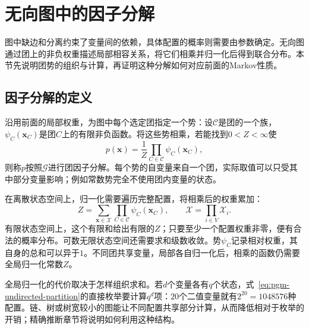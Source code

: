 \section{无向图中的因子分解}
\label{sec:pgm-undirected-factorization}

图中缺边和分离约束了变量间的依赖，具体配置的概率则需要由参数确定。无向图通过团上的非负权重描述局部相容关系，将它们相乘并归一化后得到联合分布。本节先说明团势的组织与计算，再证明这种分解如何对应前面的Markov性质。

\subsection{因子分解的定义}
\label{sec:pgm-undirected-factorization-definition}

沿用前面的局部权重，为图中每个选定团指定一个势：设$\mathcal{C}$是团的一个族，$\psi_C(\bm{x}_C)$是团$C$上的有限非负函数。将这些势相乘，若能找到$0<Z<\infty$使
\begin{equation}
  p(\bm{x})=\frac{1}{Z}\prod_{C\in\mathcal{C}}\psi_C(\bm{x}_C),
  \label{eq:pgm-undirected-factorization}
\end{equation}
则称$p$按照$\mathcal{G}$进行团因子分解。每个势的自变量来自一个团，实际取值可以只受其中部分变量影响；例如常数势完全不使用团内变量的状态。

在离散状态空间上，归一化需要遍历完整配置，将相乘后的权重累加：
\begin{equation}
  Z=\sum_{\bm{x}\in\mathcal{X}}\prod_{C\in\mathcal{C}}\psi_C(\bm{x}_C),
  \qquad
  \mathcal{X}=\prod_{i\in V}\mathcal{X}_i.
  \label{eq:pgm-undirected-partition}
\end{equation}
有限状态空间上，这个有限和给出有限的$Z$；只要至少一个配置权重非零，便有合法的概率分布。可数无限状态空间还需要求和级数收敛。势$\psi_C$记录相对权重，其自身的总和可以异于$1$。不同团共享变量，局部各自归一化后，相乘的函数仍需要全局归一化常数$Z$。

全局归一化的代价取决于怎样组织求和。若$d$个变量各有$q$个状态，式~\eqref{eq:pgm-undirected-partition}的直接枚举要计算$q^d$项：$20$个二值变量就有$2^{20}=1048576$种配置。链、树或树宽较小的图能让不同配置共享部分计算，从而降低相对于枚举的开销；精确推断章节将说明如何利用这种结构。

